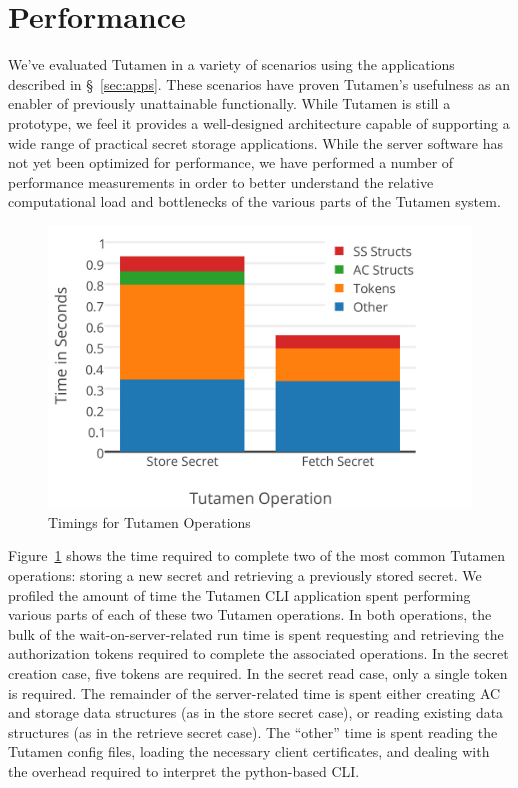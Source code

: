 \section{Performance}
\label{sec:performace}

We've evaluated Tutamen in a variety of scenarios using the
applications described in \S~\ref{sec:apps}. These scenarios have
proven Tutamen's usefulness as an enabler of previously unattainable
functionally. While Tutamen is still a prototype, we feel it provides
a well-designed architecture capable of supporting a wide range of
practical secret storage applications. While the server software has
not yet been optimized for performance, we have performed a number of
performance measurements in order to better understand the relative
computational load and bottlenecks of the various parts of the Tutamen
system.

\begin{figure}[th]
  \centering
  \includegraphics[width=\columnwidth]{./figs/png/chart-timings.png}
  \caption{Timings for Tutamen Operations}
  \label{fig:eval:timings}
\end{figure}

Figure~\ref{fig:eval:timings} shows the time required to complete two
of the most common Tutamen operations: storing a new secret and
retrieving a previously stored secret. We profiled the amount of time
the Tutamen CLI application spent performing various parts of each of
these two Tutamen operations. In both operations, the bulk of the
wait-on-server-related run time is spent requesting and retrieving the
authorization tokens required to complete the associated
operations. In the secret creation case, five tokens are required. In
the secret read case, only a single token is required. The remainder of
the server-related time is spent either creating AC and storage data
structures (as in the store secret case), or reading existing data
structures (as in the retrieve secret case). The ``other'' time is
spent reading the Tutamen config files, loading the necessary client
certificates, and dealing with the overhead required to interpret the
python-based CLI.

